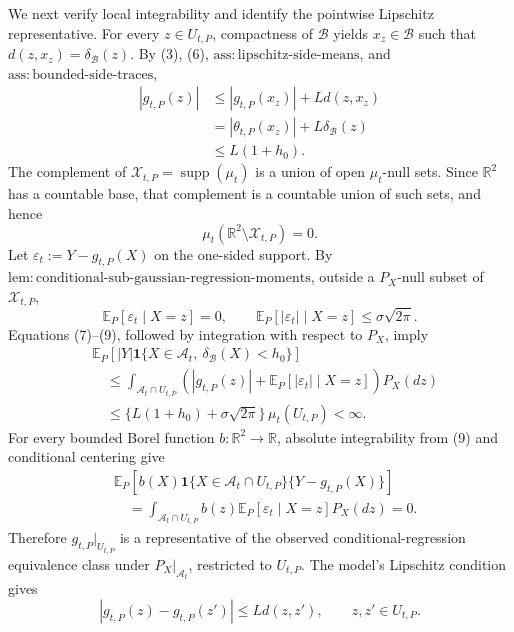 We next verify local integrability and identify the pointwise Lipschitz representative. For every \(z\in U_{t,P}\), compactness of \(\mathcal B\) yields \(x_z\in\mathcal B\) such that \(d(z,x_z)=\delta_{\mathcal B}(z)\). By (3), (6), \(\mathrm{ass:lipschitz\text{-}side\text{-}means}\), and \(\mathrm{ass:bounded\text{-}side\text{-}traces}\),
\[
 \begin{aligned}
 |g_{t,P}(z)|
 &\le |g_{t,P}(x_z)|+Ld(z,x_z)\\
 &=|\theta_{t,P}(x_z)|+L\delta_{\mathcal B}(z)\\
 &\le L(1+h_0).
 \end{aligned}
 \tag{7}
\]
The complement of \(\mathcal X_{t,P}=\operatorname{supp}(\mu_t)\) is a union of open \(\mu_t\)-null sets. Since \(\mathbb R^2\) has a countable base, that complement is a countable union of such sets, and hence
\[
 \mu_t(\mathbb R^2\setminus\mathcal X_{t,P})=0.
 \tag{8}
\]
Let \(\varepsilon_t:=Y-g_{t,P}(X)\) on the one-sided support. By \(\mathrm{lem:conditional\text{-}sub\text{-}gaussian\text{-}regression\text{-}moments}\), outside a \(P_X\)-null subset of \(\mathcal X_{t,P}\),
\[
 \mathbb E_P[\varepsilon_t\mid X=z]=0,
 \qquad
 \mathbb E_P[|\varepsilon_t|\mid X=z]\le\sigma\sqrt{2\pi}.
 \tag{9}
\]
Equations (7)--(9), followed by integration with respect to \(P_X\), imply
\[
 \begin{aligned}
 &\mathbb E_P\!\left[|Y|\mathbf 1\{X\in\mathcal A_t,\ \delta_{\mathcal B}(X)<h_0\}\right]\\
 &\quad\le
 \int_{\mathcal A_t\cap U_{t,P}}
 \left(|g_{t,P}(z)|+\mathbb E_P[|\varepsilon_t|\mid X=z]\right)P_X(dz)\\
 &\quad\le
 \{L(1+h_0)+\sigma\sqrt{2\pi}\}\,\mu_t(U_{t,P})<\infty.
 \end{aligned}
 \tag{10}
\]
For every bounded Borel function \(b:\mathbb R^2\to\mathbb R\), absolute integrability from (9) and conditional centering give
\[
 \begin{aligned}
 &\mathbb E_P\!\left[b(X)\mathbf 1\{X\in\mathcal A_t\cap U_{t,P}\}
       \{Y-g_{t,P}(X)\}\right]\\
 &\quad=
 \int_{\mathcal A_t\cap U_{t,P}}b(z)
       \mathbb E_P[\varepsilon_t\mid X=z]P_X(dz)=0.
 \end{aligned}
 \tag{11}
\]
Therefore \(g_{t,P}|_{U_{t,P}}\) is a representative of the observed conditional-regression equivalence class under \(P_X|_{\mathcal A_t}\), restricted to \(U_{t,P}\). The model's Lipschitz condition gives
\[
 |g_{t,P}(z)-g_{t,P}(z')|\le Ld(z,z'),
 \qquad z,z'\in U_{t,P}.
 \tag{12}
\]

